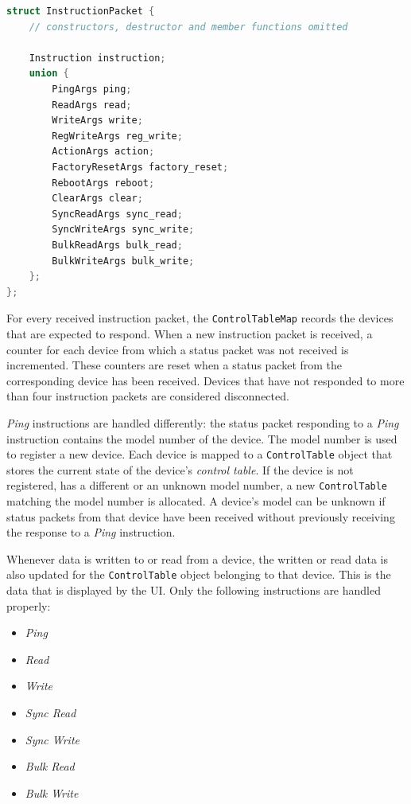 \begin{lstlisting}[language=C++, caption={Definition of the \lstinline{InstructionPacket} struct}]
struct InstructionPacket {
    // constructors, destructor and member functions omitted

    Instruction instruction;
    union {
        PingArgs ping;
        ReadArgs read;
        WriteArgs write;
        RegWriteArgs reg_write;
        ActionArgs action;
        FactoryResetArgs factory_reset;
        RebootArgs reboot;
        ClearArgs clear;
        SyncReadArgs sync_read;
        SyncWriteArgs sync_write;
        BulkReadArgs bulk_read;
        BulkWriteArgs bulk_write;
    };
};
\end{lstlisting}

For every received instruction packet, the \lstinline{ControlTableMap} records the devices that are
expected to respond. When a new instruction packet is received, a counter for each device from which
a status packet was not received is incremented. These counters are reset when a status packet from
the corresponding device has been received. Devices that have not responded to more than four instruction
packets are considered disconnected.

\textit{Ping} instructions are handled differently: the status packet responding to a \textit{Ping}
instruction contains the model number of the device. The model number is used to register a new device.
Each device is mapped to a \lstinline{ControlTable} object that stores the current state of the device's
\textit{control table}. If the device is not registered, has a different or an unknown model number,
a new \lstinline{ControlTable} matching the model number is allocated. A device's model can be unknown
if status packets from that device have been received without previously receiving the response to a
\textit{Ping} instruction.

Whenever data is written to or read from a device, the written or read data is also updated for the
\lstinline{ControlTable} object belonging to that device. This is the data that is displayed by the
UI. Only the following instructions are handled properly:

\begin{itemize}
    \item \textit{Ping}
    \item \textit{Read}
    \item \textit{Write}
    \item \textit{Sync Read}
    \item \textit{Sync Write}
    \item \textit{Bulk Read}
    \item \textit{Bulk Write}
\end{itemize}

